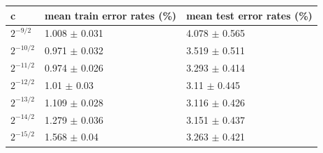 \begin{tabular}{lll}
\toprule
c & mean train error rates (\%) & mean test error rates (\%) \\
\midrule
$2^{-9/2}$ & 1.008 $\pm$ 0.031 & 4.078 $\pm$ 0.565 \\
$2^{-10/2}$ & 0.971 $\pm$ 0.032 & 3.519 $\pm$ 0.511 \\
$2^{-11/2}$ & 0.974 $\pm$ 0.026 & 3.293 $\pm$ 0.414 \\
$2^{-12/2}$ & 1.01 $\pm$ 0.03 & 3.11 $\pm$ 0.445 \\
$2^{-13/2}$ & 1.109 $\pm$ 0.028 & 3.116 $\pm$ 0.426 \\
$2^{-14/2}$ & 1.279 $\pm$ 0.036 & 3.151 $\pm$ 0.437 \\
$2^{-15/2}$ & 1.568 $\pm$ 0.04 & 3.263 $\pm$ 0.421 \\
\bottomrule
\end{tabular}
